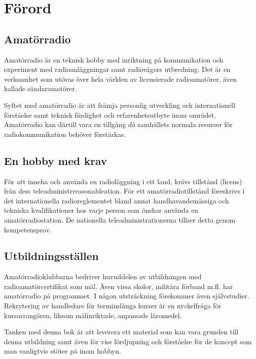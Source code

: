 \onecolumn


\chapter*{Förord}

\begin{rev-ogranskat}

\section*{Amatörradio}

Amatörradio är en teknisk hobby med inriktning på kommunikation och experiment
med radioanläggningar samt radiovågors utbredning. Det är en verksamhet som
utövas över hela världen av licensierade radioamatörer, även kallade
sändaramatörer.

Syftet med amatörradio är att främja personlig utveckling och internationell
förståelse samt teknisk färdighet och erfarenhetsutbyte inom området.
Amatörradio kan därtill vara en tillgång då samhällets normala resurser för
radiokommunikation behöver förstärkas.

\section*{En hobby med krav}

För att inneha och använda en radioläggning i ett land, krävs tillstånd (licens)
från dess teleadministrreasonableation. För ett amatörradiotillstånd föreskrivs 
i det internationella radioreglementet bland annat handhavandemässiga och 
tekniska kvalifikationer hos varje person som önskar använda en 
amatörradiostation. De nationella teleadministrationerna tillser detta genom 
kompetensprov.

\section*{Utbildningsställen}

Amatörradioklubbarna bedriver huvuddelen av utbildningen med
radioamatörcertifikat som mål. Även vissa skolor, militära förband m.fl. har
amatörradio på programmet. I någon utsträckning förekommer även självstudier.
Rekrytering av handledare för terminslånga kurser är en nyckelfråga för
kursarrangören, liksom målinriktade, anpassade läromedel.

\end{rev-ogranskat}

\begin{rev-nytt}

Tanken med denna bok är att leverera ett material som kan vara grunden till 
denna utbildning samt även för viss fördjupning och förståelse för de koncept 
som man vanligtvis stöter på inom hobbyn.

\end{rev-nytt}


